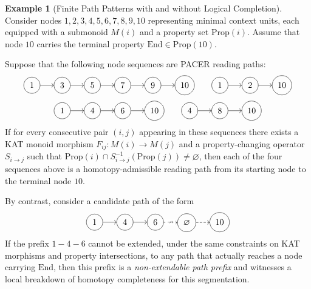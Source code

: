 \documentclass[11pt]{book}
\theoremstyle{plain}
\theoremstyle{definition}
\newtheorem{example}[theorem]{Example}
\theoremstyle{remark}
\begin{document}
\begin{example}[Finite Path Patterns with and without Logical Completion]
\label{ex:finite-path-patterns}
Consider nodes $1,2,3,4,5,6,7,8,9,10$ representing minimal context units,
each equipped with a submonoid $M(i)$ and a property set
$\mathrm{Prop}(i)$. Assume that node $10$ carries the terminal property
$\mathrm{End} \in \mathrm{Prop}(10)$.

Suppose that the following node sequences are PACER reading paths:
\[
\begin{tikzcd}[column sep=1.6em]
|[circle,draw]|{1} \arrow[r] & |[circle,draw]|{3} \arrow[r] & |[circle,draw]|{5} \arrow[r] & |[circle,draw]|{7} \arrow[r] & |[circle,draw]|{9} \arrow[r] & |[circle,draw]|{10}
\end{tikzcd}
\qquad
\begin{tikzcd}[column sep=1.6em]
|[circle,draw]|{1} \arrow[r] & |[circle,draw]|{2} \arrow[r] & |[circle,draw]|{10}
\end{tikzcd}
\]
\[
\begin{tikzcd}[column sep=1.6em]
|[circle,draw]|{1} \arrow[r] & |[circle,draw]|{4} \arrow[r] & |[circle,draw]|{6} \arrow[r] & |[circle,draw]|{10}
\end{tikzcd}
\qquad
\begin{tikzcd}[column sep=1.6em]
|[circle,draw]|{4} \arrow[r] & |[circle,draw]|{8} \arrow[r] & |[circle,draw]|{10}
\end{tikzcd}
\]
If for every consecutive pair $(i,j)$ appearing in these sequences there
exists a KAT monoid morphism $F_{ij}:M(i)\to M(j)$ and a property-changing
operator $S_{i\to j}$ such that
$\mathrm{Prop}(i) \cap S_{i\to j}^{-1}(\mathrm{Prop}(j)) \neq \varnothing$,
then each of the four sequences above is a homotopy-admissible reading path
from its starting node to the terminal node $10$.

By contrast, consider a candidate path of the form
\[
  \begin{tikzcd}[column sep=1.6em]
  |[circle,draw]|{1} \arrow[r] & |[circle,draw]|{4} \arrow[r] & |[circle,draw]|{6} \arrow[r, dashed, "\nrightarrow" description] & |[circle,draw]|{\varnothing} \arrow[r, dashed] & |[circle,draw]|{10}
  \end{tikzcd}
\]
If the prefix $1 \!-\! 4 \!-\! 6$ cannot be extended, under the same
constraints on KAT morphisms and property intersections, to any path that
actually reaches a node carrying $\mathrm{End}$, then this prefix is a
\emph{non-extendable path prefix} and witnesses a local breakdown of
homotopy completeness for this segmentation.
\end{example}
\end{document}
